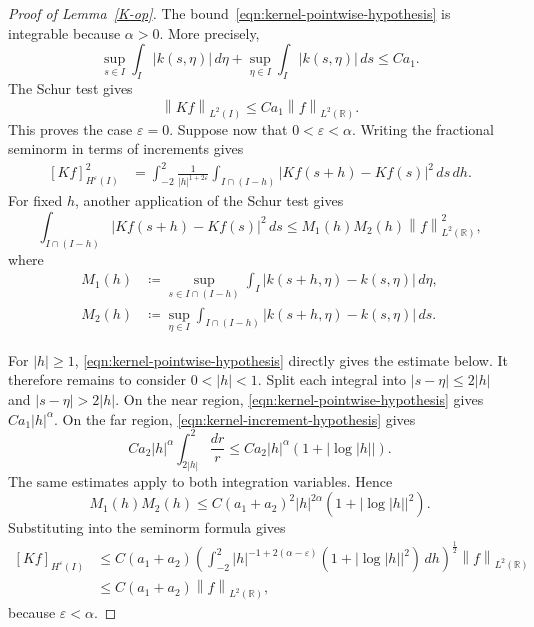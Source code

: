 \documentclass[11pt,reqno]{amsart}
\theoremstyle{plain}
\theoremstyle{definition}
\numberwithin{equation}{section}
\newcommand{\paren}[1]{\left(#1\right)}
\newcommand{\abs}[1]{\left\lvert #1 \right\rvert}
\newcommand{\norm}[1]{\left\lVert #1 \right\rVert}
\newcommand{\R}{\mathbb{R}}
\newcommand{\hi}[1]{H^{#1}(I)}
\begin{document}
\begin{proof}[Proof of Lemma~\ref{K-op}]
The bound~\eqref{eqn:kernel-pointwise-hypothesis} is integrable because $\alpha>0$. More precisely,
\begin{equation}
    \sup_{s\in I}\int_I\abs{k(s,\eta)}\,d\eta
    +\sup_{\eta\in I}\int_I\abs{k(s,\eta)}\,ds
    \le C a_1.
\end{equation}
The Schur test gives
\begin{equation}
    \norm{K f}_{L^2(I)}
    \le C a_1 \norm{f}_{L^2(\R)}.
\end{equation}
This proves the case $\varepsilon=0$. Suppose now that
$0<\varepsilon<\alpha$. Writing the fractional seminorm in terms of
increments gives
\begin{equation}
\begin{aligned}
    [Kf]_{\hi{\varepsilon}}^2
    &=\int_{-2}^2\frac{1}{\abs h^{1+2\varepsilon}}
    \int_{I\cap(I-h)}
    \abs{Kf(s+h)-Kf(s)}^2\,ds\,dh.
\end{aligned}
\end{equation}
For fixed $h$, another application of the Schur test gives
\begin{equation}
    \int_{I\cap(I-h)}
    \abs{Kf(s+h)-Kf(s)}^2\,ds
    \le M_1(h)M_2(h)\norm{f}_{L^2(\R)}^2,
\end{equation}
where
\begin{align}
    M_1(h)&\coloneqq
    \sup_{s\in I\cap(I-h)}\int_I
    \abs{k(s+h,\eta)-k(s,\eta)}\,d\eta,\\
    M_2(h)&\coloneqq
    \sup_{\eta\in I}\int_{I\cap(I-h)}
    \abs{k(s+h,\eta)-k(s,\eta)}\,ds.
\end{align}

For $\abs h\ge1$, \eqref{eqn:kernel-pointwise-hypothesis} directly gives the estimate below.
It therefore remains to consider $0<\abs h<1$. Split each integral into
$\abs{s-\eta}\le2\abs h$ and $\abs{s-\eta}>2\abs h$. On the near region,
\eqref{eqn:kernel-pointwise-hypothesis} gives $Ca_1\abs h^\alpha$. On the far region,
\eqref{eqn:kernel-increment-hypothesis} gives
\begin{equation}
    Ca_2\abs h^\alpha
    \int_{2\abs h}^{2}\frac{dr}{r}
    \le Ca_2\abs h^\alpha\paren{1+\abs{\log\abs h}}.
\end{equation}
The same estimates apply to both integration variables. Hence
\begin{equation}
    M_1(h)M_2(h)
    \le C\paren{a_1+a_2}^2\abs h^{2\alpha}
    \paren{1+\abs{\log\abs h}^2}.
\end{equation}
Substituting into the seminorm formula gives
\begin{equation}
\begin{aligned}
    [Kf]_{\hi{\varepsilon}}
    &\le C\paren{a_1+a_2}
    \left(\int_{-2}^2
    \abs h^{-1+2(\alpha-\varepsilon)}
    \paren{1+\abs{\log\abs h}^2}\,dh\right)^{\frac12}
    \norm{f}_{L^2(\R)} \\
    &\le C\paren{a_1+a_2}\norm{f}_{L^2(\R)},
\end{aligned}
\end{equation}
because $\varepsilon<\alpha$.
\end{proof}
\end{document}
